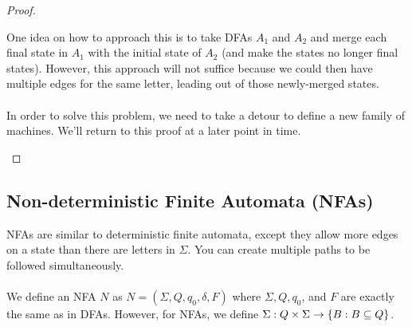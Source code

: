 \documentclass[]{article}
\DeclarePairedDelimiter{\set}{\lbrace}{\rbrace}
\theoremstyle{definition}
\begin{document}
\begin{proof}
\begin{enumerate}
            One idea on how to approach this is to take DFAs $A_1$ and $A_2$ and merge each final state in $A_1$ with the initial state of $A_2$ (and make the states no longer final states). However, this approach will not suffice because we could then have multiple edges for the same letter, leading out of those newly-merged states.
            \\ \\
            In order to solve this problem, we need to take a detour to define a new family of machines. We'll return to this proof at a later point in time. \qedhere
          \end{enumerate}
        \end{proof}

    \subsection{Non-deterministic Finite Automata (NFAs)}
      NFAs are similar to deterministic finite automata, except they allow more edges on a state than there are letters in $\Sigma$. You can create multiple paths to be followed simultaneously.
      \\ \\
      We define an NFA $N$ as $N = (\Sigma, Q, q_0, \delta, F)$ where $\Sigma, Q, q_0$, and $F$ are exactly the same as in DFAs. However, for NFAs, we define $\Sigma: Q \times \Sigma \to \set{ B : B \subseteq Q }$.
\end{document}
